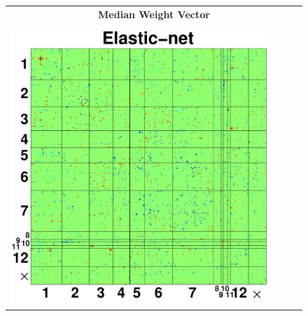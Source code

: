 \begin{figure}[t!]\begin{minipage}{\textwidth}
	\renewcommand{\imwidth}  {0.3\linewidth}
	\setlength{\tabcolsep}{1pt} 
	\begin{tabular}{cccc}
	\multicolumn{4}{c}{{\textbf{\large{Median Weight Vector}}}} \vspace{0pt} \\
	\includegraphics[width=\imwidth]{exp_median_wmat_enet.pdf} &

\end{tabular}
\end{minipage}
\end{figure}
